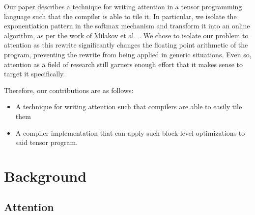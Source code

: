 \documentclass[review, anonymous, sigplan]{acmart}
\begin{document}
Our paper describes a technique for writing attention in a tensor programming language such that the compiler is able to tile it. In particular, we isolate the exponentiation pattern in the softmax mechanism and transform it into an online algorithm, as per the work of Milakov et al.~\cite{milakov_online_2018}. We chose to isolate our problem to attention as this rewrite significantly changes the floating point arithmetic of the program, preventing the rewrite from being applied in generic situations. Even so, attention as a field of research still garners enough effort that it makes sense to target it specifically.

\vspace{.5em}
\noindent
Therefore, our contributions are as follows:
\begin{itemize}
	\item A technique for writing attention such that compilers are able to easily tile them
  \item A compiler implementation that can apply such block-level optimizations to said tensor program.
\end{itemize}

\section{Background}

%
%
%

\subsection{Attention}

\end{document}

